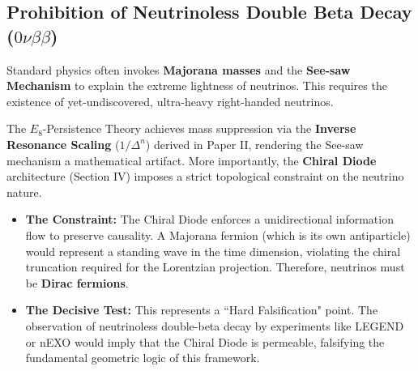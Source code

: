 \subsection{Prohibition of Neutrinoless Double Beta Decay (\texorpdfstring{$0\nu\beta\beta$}{0nubetabeta})}

Standard physics often invokes \textbf{Majorana masses} and the \textbf{See-saw Mechanism} to explain the extreme lightness of neutrinos. This requires the existence of yet-undiscovered, ultra-heavy right-handed neutrinos.

The $E_8$-Persistence Theory achieves mass suppression via the \textbf{Inverse Resonance Scaling} ($1/\Delta^n$) derived in Paper II, rendering the See-saw mechanism a mathematical artifact. More importantly, the \textbf{Chiral Diode} architecture (Section IV) imposes a strict topological constraint on the neutrino nature.

\begin{itemize}
    \item \textbf{The Constraint:} The Chiral Diode enforces a unidirectional information flow to preserve causality. A Majorana fermion (which is its own antiparticle) would represent a standing wave in the time dimension, violating the chiral truncation required for the Lorentzian projection. Therefore, neutrinos must be \textbf{Dirac fermions}.
    
    \item \textbf{The Decisive Test:} This represents a ``Hard Falsification" point. The observation of neutrinoless double-beta decay by experiments like LEGEND or nEXO would imply that the Chiral Diode is permeable, falsifying the fundamental geometric logic of this framework.
\end{itemize}